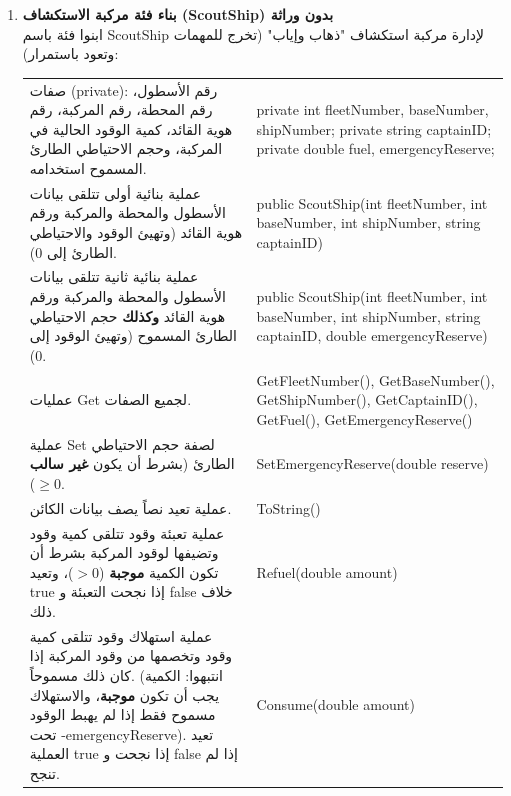 \documentclass[14pt]{extarticle}
\begin{document}
\begin{enumerate}[label=\textbf{تمرين \arabic*:}, wide=0pt, leftmargin=*, itemsep=2.2em]

    \item \textbf{بناء فئة مركبة الاستكشاف (\textenglish{ScoutShip}) بدون وراثة} \\
    ابنوا فئة باسم \textenglish{ScoutShip} لإدارة مركبة استكشاف "ذهاب وإياب" (تخرج للمهمات وتعود باستمرار):

    {\centering
    \renewcommand{\arraystretch}{1.2}
    \small
    \begin{tabular}{|>{\raggedleft\arraybackslash}p{}|>{\raggedright\arraybackslash}p{}|}
    \hline
    \multicolumn{2}{|c|}{\textbf{الفئة: \textenglish{ScoutShip}}} \\
    \hline
    صفات (\textenglish{private}): رقم الأسطول، رقم المحطة، رقم المركبة، رقم هوية القائد، كمية الوقود الحالية في المركبة، وحجم الاحتياطي الطارئ المسموح استخدامه. & \textenglish{private int fleetNumber, baseNumber, shipNumber;} \newline \textenglish{private string captainID;} \newline \textenglish{private double fuel, emergencyReserve;} \\
    \hline
    عملية بنائية أولى تتلقى بيانات الأسطول والمحطة والمركبة ورقم هوية القائد (وتهيئ الوقود والاحتياطي الطارئ إلى \textenglish{0}). & \textenglish{public ScoutShip(int fleetNumber, int baseNumber, int shipNumber, string captainID)} \\
    \hline
    عملية بنائية ثانية تتلقى بيانات الأسطول والمحطة والمركبة ورقم هوية القائد \textbf{وكذلك} حجم الاحتياطي الطارئ المسموح (وتهيئ الوقود إلى \textenglish{0}). & \textenglish{public ScoutShip(int fleetNumber, int baseNumber, int shipNumber, string captainID, double emergencyReserve)} \\
    \hline
    عمليات \textenglish{Get} لجميع الصفات. & \textenglish{GetFleetNumber(), GetBaseNumber(), GetShipNumber(), GetCaptainID(), GetFuel(), GetEmergencyReserve()} \\
    \hline
    عملية \textenglish{Set} لصفة حجم الاحتياطي الطارئ (بشرط أن يكون \textbf{غير سالب} $\ge 0$). & \textenglish{SetEmergencyReserve(double reserve)} \\
    \hline
    عملية تعيد نصاً يصف بيانات الكائن. & \textenglish{ToString()} \\
    \hline
    عملية تعبئة وقود تتلقى كمية وقود وتضيفها لوقود المركبة بشرط أن تكون الكمية \textbf{موجبة} ($> 0$)، وتعيد \textenglish{true} إذا نجحت التعبئة و \textenglish{false} خلاف ذلك. & \textenglish{Refuel(double amount)} \\
    \hline
    عملية استهلاك وقود تتلقى كمية وقود وتخصمها من وقود المركبة إذا كان ذلك مسموحاً. (انتبهوا: الكمية يجب أن تكون \textbf{موجبة}، والاستهلاك مسموح فقط إذا لم يهبط الوقود تحت \textenglish{-emergencyReserve}). تعيد العملية \textenglish{true} إذا نجحت و \textenglish{false} إذا لم تنجح. & \textenglish{Consume(double amount)} \\
    \hline
    \end{tabular}
    \par} %


\end{enumerate}
\end{document}
